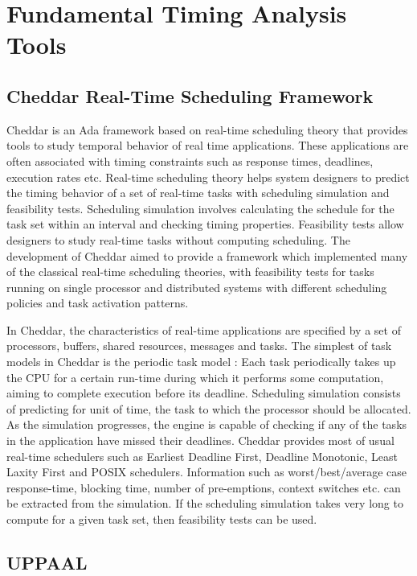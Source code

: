 \section{Fundamental Timing Analysis Tools}

\subsection{Cheddar Real-Time Scheduling Framework}

Cheddar \cite{Cheddar} is an Ada framework based on real-time scheduling theory
that provides tools to study temporal behavior of real time applications. These
applications are often associated with timing constraints such as response
times, deadlines, execution rates etc. Real-time scheduling theory helps system
designers to predict the timing behavior of a set of real-time tasks with
scheduling simulation and feasibility tests. Scheduling simulation involves
calculating the schedule for the task set within an interval and checking timing
properties. Feasibility tests allow designers to study real-time tasks without
computing scheduling. The development of Cheddar aimed to provide a framework
which implemented many of the classical real-time scheduling theories, with
feasibility tests for tasks running on single processor and distributed systems
with different scheduling policies and task activation patterns.

In Cheddar, the characteristics of real-time applications are specified by a set
of processors, buffers, shared resources, messages and tasks. The simplest of
task models in Cheddar is the periodic task model \cite{liu1973scheduling}: Each
task periodically takes up the CPU for a certain run-time during which it
performs some computation, aiming to complete execution before its deadline.
Scheduling simulation consists of predicting for unit of time, the task to which
the processor should be allocated. As the simulation progresses, the engine is
capable of checking if any of the tasks in the application have missed their
deadlines. Cheddar provides most of usual real-time schedulers such as Earliest
Deadline First, Deadline Monotonic, Least Laxity First and POSIX schedulers.
Information such as worst/best/average case response-time, blocking time, number
of pre-emptions, context switches etc. can be extracted from the simulation. If
the scheduling simulation takes very long to compute for a given task set, then
feasibility tests can be used.

\subsection{UPPAAL}

